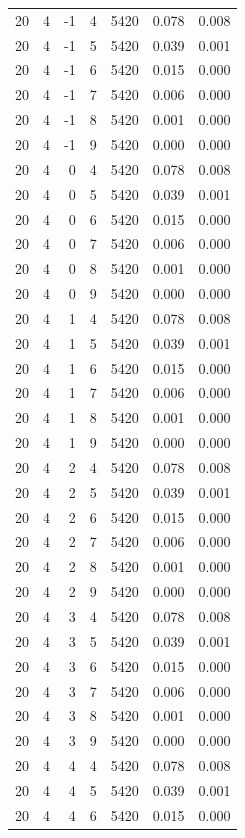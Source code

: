 \begin{table}
\begin{tabular}{rrrrrrr}
20 & 4 & -1 & 4 & 5420 & 0.078 & 0.008 \\
20 & 4 & -1 & 5 & 5420 & 0.039 & 0.001 \\
20 & 4 & -1 & 6 & 5420 & 0.015 & 0.000 \\
20 & 4 & -1 & 7 & 5420 & 0.006 & 0.000 \\
20 & 4 & -1 & 8 & 5420 & 0.001 & 0.000 \\
20 & 4 & -1 & 9 & 5420 & 0.000 & 0.000 \\
20 & 4 & 0 & 4 & 5420 & 0.078 & 0.008 \\
20 & 4 & 0 & 5 & 5420 & 0.039 & 0.001 \\
20 & 4 & 0 & 6 & 5420 & 0.015 & 0.000 \\
20 & 4 & 0 & 7 & 5420 & 0.006 & 0.000 \\
20 & 4 & 0 & 8 & 5420 & 0.001 & 0.000 \\
20 & 4 & 0 & 9 & 5420 & 0.000 & 0.000 \\
20 & 4 & 1 & 4 & 5420 & 0.078 & 0.008 \\
20 & 4 & 1 & 5 & 5420 & 0.039 & 0.001 \\
20 & 4 & 1 & 6 & 5420 & 0.015 & 0.000 \\
20 & 4 & 1 & 7 & 5420 & 0.006 & 0.000 \\
20 & 4 & 1 & 8 & 5420 & 0.001 & 0.000 \\
20 & 4 & 1 & 9 & 5420 & 0.000 & 0.000 \\
20 & 4 & 2 & 4 & 5420 & 0.078 & 0.008 \\
20 & 4 & 2 & 5 & 5420 & 0.039 & 0.001 \\
20 & 4 & 2 & 6 & 5420 & 0.015 & 0.000 \\
20 & 4 & 2 & 7 & 5420 & 0.006 & 0.000 \\
20 & 4 & 2 & 8 & 5420 & 0.001 & 0.000 \\
20 & 4 & 2 & 9 & 5420 & 0.000 & 0.000 \\
20 & 4 & 3 & 4 & 5420 & 0.078 & 0.008 \\
20 & 4 & 3 & 5 & 5420 & 0.039 & 0.001 \\
20 & 4 & 3 & 6 & 5420 & 0.015 & 0.000 \\
20 & 4 & 3 & 7 & 5420 & 0.006 & 0.000 \\
20 & 4 & 3 & 8 & 5420 & 0.001 & 0.000 \\
20 & 4 & 3 & 9 & 5420 & 0.000 & 0.000 \\
20 & 4 & 4 & 4 & 5420 & 0.078 & 0.008 \\
20 & 4 & 4 & 5 & 5420 & 0.039 & 0.001 \\
20 & 4 & 4 & 6 & 5420 & 0.015 & 0.000 \\

\end{tabular}
\end{table}
